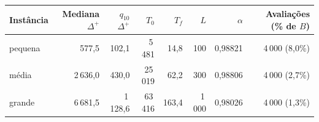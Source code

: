 \begin{tabular}{lrrrrrrr}
\toprule
Instância & Mediana $\Delta^+$ & $q_{10}$ $\Delta^+$ & $T_0$ & $T_f$ & $L$ & $\alpha$ & Avaliações (\% de $B$) \\
\midrule
pequena & 577,5 & 102,1 & 5\,481 & 14,8 & 100 & 0,98821 & 4\,000 (8,0\%) \\
média & 2\,636,0 & 430,0 & 25\,019 & 62,2 & 300 & 0,98806 & 4\,000 (2,7\%) \\
grande & 6\,681,5 & 1\,128,6 & 63\,416 & 163,4 & 1\,000 & 0,98026 & 4\,000 (1,3\%) \\
\bottomrule
\end{tabular}
